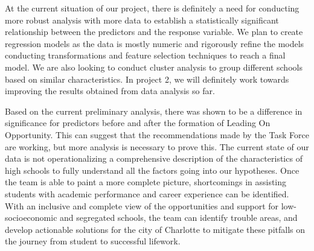 At the current situation of our project, there is definitely a need for conducting more robust analysis with more data to establish a statistically significant relationship between the predictors and the response variable. 
We plan to create regression models as the data is mostly numeric and rigorously refine the models conducting transformations and feature selection techniques to reach a final model.
We are also looking to conduct cluster analysis to group different schools based on similar  characteristics. In project 2, we will definitely work towards improving the results obtained from data analysis so far. 

Based on the current preliminary analysis, there was shown to be a difference in significance for predictors before and after the formation of Leading On Opportunity. 
This can suggest that the recommendations made by the Task Force are working, but more analysis is necessary to prove this. 
The current state of our data is not operationalizing a comprehensive description of the characteristics of high schools to fully understand all the factors going into our hypotheses. 
Once the team is able to paint a more complete picture, shortcomings in assisting students with academic performance and career experience can be identified. 
With an inclusive and complete view of the opportunities and support for low-socioeconomic and segregated schools, 
the team can identify trouble areas, and develop actionable solutions for the city of Charlotte to mitigate these pitfalls on the journey from student to successful lifework. 